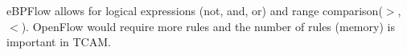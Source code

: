 %


eBPFlow allows for logical expressions (not, and, or) and range comparison($>$,$<$). OpenFlow would require more rules and the number of rules (memory) is important in TCAM. 



